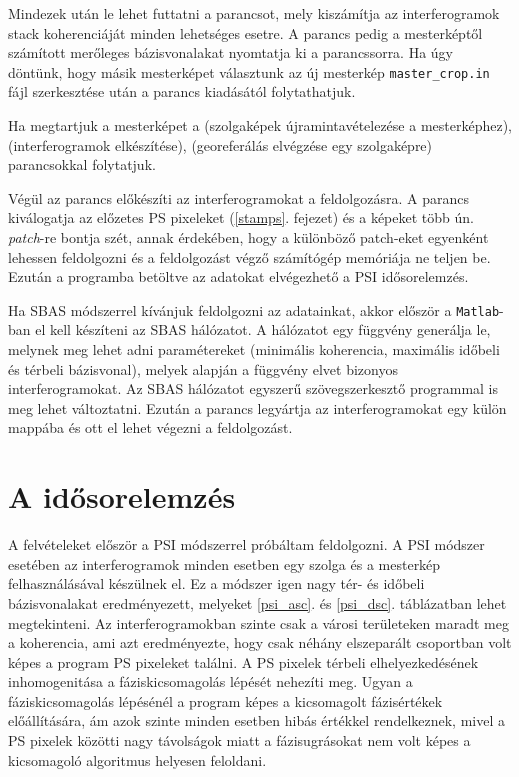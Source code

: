 \documentclass[12pt]{report}
\numberwithin{equation}{section}
\numberwithin{table}{section}
\numberwithin{figure}{section}
\begin{document}
\begin{sloppypar}
Mindezek után le lehet futtatni a  parancsot, mely kiszámítja az interferogramok stack koherenciáját minden lehetséges esetre. A  parancs pedig a mesterképtől számított merőleges bázisvonalakat nyomtatja ki a parancssorra. Ha úgy döntünk, hogy másik mesterképet választunk az új mesterkép \texttt{master\_crop.in} fájl szerkesztése után a  parancs kiadásától folytathatjuk.
\end{sloppypar}

Ha megtartjuk a mesterképet a  (szolgaképek újramintavételezése a mesterképhez),  (interferogramok elkészítése),  (georeferálás elvégzése egy szolgaképre) parancsokkal folytatjuk.

Végül az  parancs előkészíti az interferogramokat a \stamps feldolgozásra. A parancs kiválogatja az előzetes PS pixeleket (\ref{stamps}. fejezet) és a képeket több ún. \textit{patch}-re bontja szét, annak érdekében, hogy a különböző patch-eket egyenként lehessen feldolgozni és a feldolgozást végző számítógép memóriája ne teljen be. Ezután a \stamps programba betöltve az adatokat elvégezhető a PSI idősorelemzés.

Ha SBAS módszerrel kívánjuk feldolgozni az adatainkat, akkor először a \texttt{Matlab}-ban el kell készíteni az SBAS hálózatot. A hálózatot egy függvény generálja le, melynek meg lehet adni paramétereket (minimális koherencia, maximális időbeli és térbeli bázisvonal), melyek alapján a függvény elvet bizonyos interferogramokat. Az SBAS hálózatot egyszerű szövegszerkesztő programmal is meg lehet változtatni. Ezután a  parancs legyártja az interferogramokat egy külön mappába és ott el lehet végezni a \stamps feldolgozást.

\section{A \stamps idősorelemzés}

A felvételeket először a PSI módszerrel próbáltam feldolgozni. A PSI módszer esetében az interferogramok minden esetben egy szolga és a mesterkép felhasználásával készülnek el. Ez a módszer igen nagy tér- és időbeli bázisvonalakat eredményezett, melyeket \ref{psi_asc}. és \ref{psi_dsc}. táblázatban lehet megtekinteni. Az interferogramokban szinte csak a városi területeken maradt meg a koherencia, ami azt eredményezte, hogy csak néhány elszeparált csoportban volt képes a program PS pixeleket találni. A PS pixelek térbeli elhelyezkedésének inhomogenitása a fáziskicsomagolás lépését nehezíti meg. Ugyan a fáziskicsomagolás lépésénél a program képes a kicsomagolt fázisértékek előállítására, ám azok szinte minden esetben hibás értékkel rendelkeznek, mivel a PS pixelek közötti nagy távolságok miatt a fázisugrásokat nem volt képes a kicsomagoló algoritmus helyesen feloldani.
\end{document}
